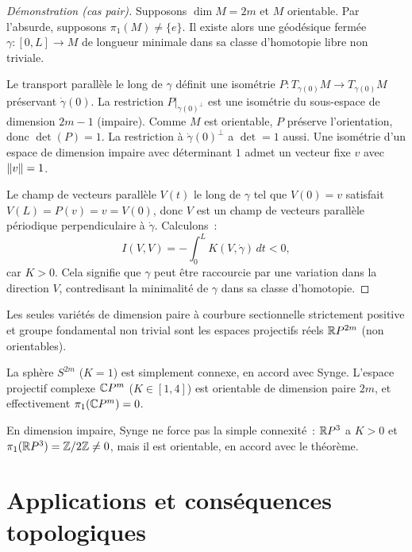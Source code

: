 \begin{proof}[D\'emonstration (cas pair)]
Supposons $\dim M = 2m$ et $M$ orientable. Par l'absurde, supposons $\pi_1(M) \neq \{e\}$.
Il existe alors une g\'eod\'esique ferm\'ee $\gamma : [0, L] \to M$ de longueur
minimale dans sa classe d'homotopie libre non triviale.

Le transport parall\`ele le long de $\gamma$ d\'efinit une isom\'etrie
$P : T_{\gamma(0)}M \to T_{\gamma(0)}M$ pr\'eservant $\dot{\gamma}(0)$.
La restriction $P|_{\dot{\gamma}(0)^\perp}$ est une isom\'etrie du sous-espace
de dimension $2m - 1$ (impaire). Comme $M$ est orientable, $P$ pr\'eserve
l'orientation, donc $\det(P) = 1$. La restriction \`a $\dot{\gamma}(0)^\perp$
a $\det = 1$ aussi. Une isom\'etrie d'un espace de dimension impaire avec
d\'eterminant $1$ admet un vecteur fixe $v$ avec $\left\| v \right\| = 1$.

Le champ de vecteurs parall\`ele $V(t)$ le long de $\gamma$ tel que $V(0) = v$
satisfait $V(L) = P(v) = v = V(0)$, donc $V$ est un champ de vecteurs parall\`ele
p\'eriodique perpendiculaire \`a $\dot{\gamma}$. Calculons~:
\[
    I(V, V) = -\int_0^L K(V, \dot{\gamma}) \, dt < 0,
\]
car $K > 0$. Cela signifie que $\gamma$ peut \^etre raccourcie par une variation
dans la direction $V$, contredisant la minimalit\'e de $\gamma$ dans sa classe
d'homotopie.
\end{proof}

\begin{corollaire}
Les seules vari\'et\'es de dimension paire \`a courbure sectionnelle strictement
positive et groupe fondamental non trivial sont les espaces projectifs r\'eels
$\mathbb{R} P^{2m}$ (non orientables).
\end{corollaire}

\begin{exemple}[$S^{2m}$ et $\C P^m$]
La sph\`ere $S^{2m}$ ($K = 1$) est simplement connexe, en accord avec Synge.
L'espace projectif complexe $\C P^m$ ($K \in [1, 4]$) est orientable de dimension
paire $2m$, et effectivement $\pi_1(\mathbb{C} P^m) = 0$.
\end{exemple}

\begin{exemple}[$S^3$ et $\R P^3$]
En dimension impaire, Synge ne force pas la simple connexit\'e~: $\R P^3$ a $K > 0$
et $\pi_1(\mathbb{R} P^3) = \mathbb{Z}/2\mathbb{Z} \neq 0$, mais il est orientable, en accord avec le
th\'eor\`eme.
\end{exemple}

\section{Applications et cons\'equences topologiques}

